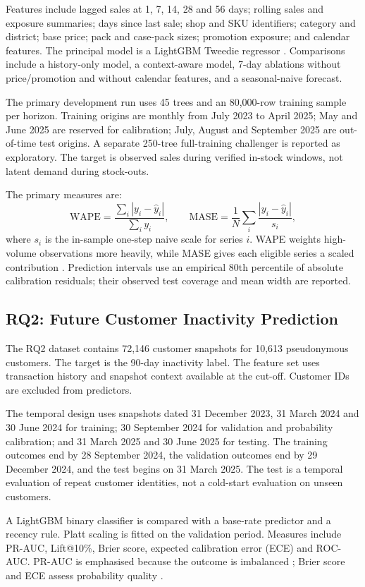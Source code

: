 Features include lagged sales at 1, 7, 14, 28 and 56 days; rolling sales and exposure summaries; days since last sale; shop and SKU identifiers; category and district; base price; pack and case-pack sizes; promotion exposure; and calendar features. The principal model is a LightGBM Tweedie regressor \citep{ke2017lightgbm}. Comparisons include a history-only model, a context-aware model, 7-day ablations without price/promotion and without calendar features, and a seasonal-naive forecast.

The primary development run uses 45 trees and an 80,000-row training sample per horizon. Training origins are monthly from July 2023 to April 2025; May and June 2025 are reserved for calibration; July, August and September 2025 are out-of-time test origins. A separate 250-tree full-training challenger is reported as exploratory. The target is observed sales during verified in-stock windows, not latent demand during stock-outs.

The primary measures are:
\[
\mathrm{WAPE}=\frac{\sum_i |y_i-\hat y_i|}{\sum_i y_i},
\qquad
\mathrm{MASE}=\frac{1}{N}\sum_i
\frac{|y_i-\hat y_i|}{s_i},
\]
where \(s_i\) is the in-sample one-step naive scale for series \(i\). WAPE weights high-volume observations more heavily, while MASE gives each eligible series a scaled contribution \citep{hyndman2006accuracy}. Prediction intervals use an empirical 80th percentile of absolute calibration residuals; their observed test coverage and mean width are reported.

\subsection{RQ2: Future Customer Inactivity Prediction}
The RQ2 dataset contains 72,146 customer snapshots for 10,613 pseudonymous customers. The target is the 90-day inactivity label. The feature set uses transaction history and snapshot context available at the cut-off. Customer IDs are excluded from predictors.

The temporal design uses snapshots dated 31 December 2023, 31 March 2024 and 30 June 2024 for training; 30 September 2024 for validation and probability calibration; and 31 March 2025 and 30 June 2025 for testing. The training outcomes end by 28 September 2024, the validation outcomes end by 29 December 2024, and the test begins on 31 March 2025. The test is a temporal evaluation of repeat customer identities, not a cold-start evaluation on unseen customers.

A LightGBM binary classifier is compared with a base-rate predictor and a recency rule. Platt scaling is fitted on the validation period. Measures include PR-AUC, Lift@10\%, Brier score, expected calibration error (ECE) and ROC-AUC. PR-AUC is emphasised because the outcome is imbalanced \citep{saito2015pr}; Brier score and ECE assess probability quality \citep{brier1950verification,niculescu2005calibration}.


